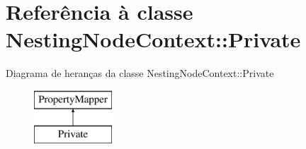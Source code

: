 \hypertarget{class_nesting_node_context_1_1_private}{\section{Referência à classe Nesting\-Node\-Context\-:\-:Private}
\label{class_nesting_node_context_1_1_private}
}
Diagrama de heranças da classe Nesting\-Node\-Context\-:\-:Private\begin{figure}[H]
\begin{center}
\leavevmode
\includegraphics[height=2.000000cm]{class_nesting_node_context_1_1_private}
\end{center}
\end{figure}
